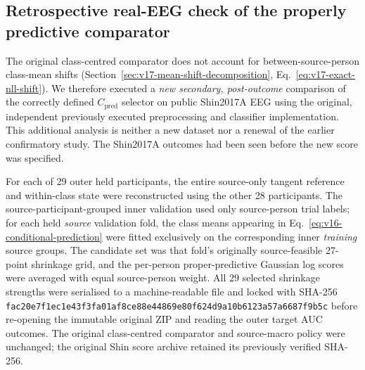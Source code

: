 \subsection{Retrospective real-EEG check of the properly predictive comparator}
\label{sec:v18-fair-predictive}
The original class-centred comparator does not account for
between-source-person class-mean shifts
(Section~\ref{sec:v17-mean-shift-decomposition}, Eq.~\eqref{eq:v17-exact-nll-shift}).
We therefore executed a \emph{new secondary, post-outcome} comparison
of the correctly defined $C_{\mathrm{pred}}$ selector on public
Shin2017A EEG using the original, independent previously executed
preprocessing and classifier implementation. This additional
analysis is neither a new dataset nor a renewal of the earlier
confirmatory study. The Shin2017A outcomes had been seen before
the new score was specified.

For each of 29 outer held participants, the entire source-only
tangent reference and within-class state were reconstructed using
the other 28 participants. The source-participant-grouped inner
validation used only source-person trial labels; for each held
\emph{source} validation fold, the class means appearing in
Eq.~\eqref{eq:v16-conditional-prediction} were fitted exclusively
on the corresponding inner \emph{training} source groups.
The candidate set was that fold's originally source-feasible
27-point shrinkage grid, and the per-person proper-predictive
Gaussian log scores were averaged with equal source-person
weight. All 29 selected shrinkage strengths were serialised to
a machine-readable file and locked with SHA-256
\texttt{fac20e7f1ec1e43f3fa01af8ce88e44869e80f624d9a10b6123a57a6687f9b5c}
before re-opening the immutable original ZIP and reading the
outer target AUC outcomes. The original class-centred comparator
and source-macro policy were unchanged; the original Shin
score archive retained its previously verified SHA-256.

